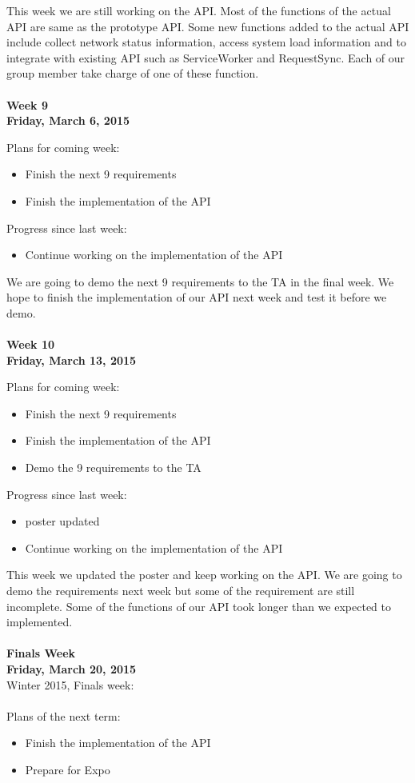 \noindent This week we are still working on the API. Most of the functions of the actual API are same as the prototype API. Some new functions added to the actual API include collect network status information, access system load information and to integrate with existing API such as ServiceWorker and RequestSync. Each of our group member take charge of one of these function. \\
\\
\textbf{Week 9\\Friday, March 6, 2015\\}

\noindent Plans for coming week:
\begin{itemize}
\item Finish the next 9 requirements
\item Finish the implementation of the API
\end{itemize}

\noindent Progress since last week:
\begin{itemize}
\item Continue working on the implementation of the API
\end{itemize}

\noindent We are going to demo the next 9 requirements to the TA in the final week. We hope to finish the implementation of our API next week and test it before we demo. \\
\\
\textbf{Week 10\\Friday, March 13, 2015\\}

\noindent Plans for coming week:
\begin{itemize}
\item Finish the next 9 requirements
\item Finish the implementation of the API
\item Demo the 9 requirements to the TA
\end{itemize}

\noindent Progress since last week:
\begin{itemize}
\item poster updated
\item Continue working on the implementation of the API
\end{itemize}

\noindent This week we updated the poster and keep working on the API. We are going to demo the requirements next week but some of the requirement are still incomplete. Some of the functions of our API took longer than we expected to implemented. \\
\\
\textbf{Finals Week\\Friday, March 20, 2015\\}
Winter 2015, Finals week: \\
\\
\noindent Plans of the next term:
\begin{itemize}
\item Finish the implementation of the API
\item Prepare for Expo
\end{itemize}


